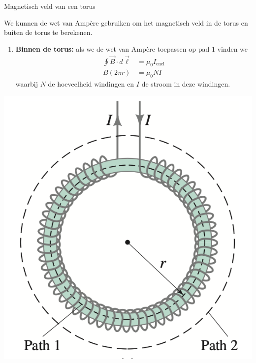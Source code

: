 \newpage

\begin{app}{Magnetisch veld van een torus}
    \begin{minipage}{.73\textwidth}
        We kunnen de wet van Ampère gebruiken om het magnetisch veld in de torus en buiten de torus te berekenen.
        \begin{enumerate}
            \item \textbf{Binnen de torus:} als we de wet van Ampère toepassen op pad 1 vinden we 
            \begin{align*}
                \oint \Vec{B} \cdot d\Vec{\ell} &= \mu_{0}I_{\text{encl}} \\
                        B(2 \pi r) &= \mu_{0}NI
            \end{align*}
            waarbij $N$ de hoeveelheid windingen en $I$ de stroom in deze windingen.
        \end{enumerate}
    \end{minipage}
    \begin{minipage}{.23\textwidth}
        \vspace{-0.55cm}
        \includegraphics[scale = 0.4]{Images/Magnetisme/MagnetischVeldTorus.png}

\end{minipage}
\end{app}
